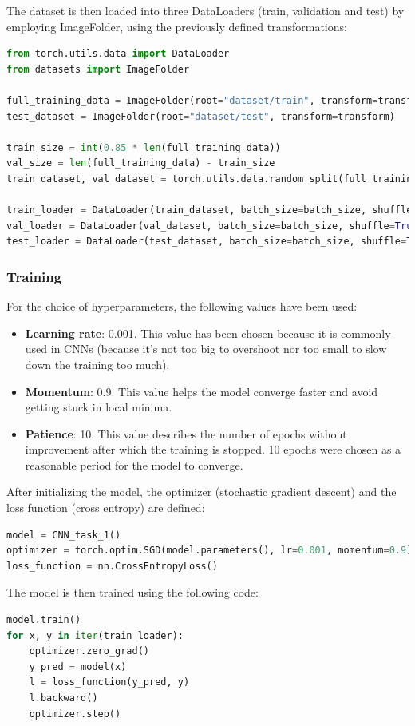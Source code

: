 \documentclass[a4paper, 11pt]{article}
\begin{document}
The dataset is then loaded into three DataLoaders (train, validation and test) 
by employing ImageFolder, using the previously defined transformations: 
\begin{lstlisting}[language=Python]
from torch.utils.data import DataLoader
from datasets import ImageFolder

full_training_data = ImageFolder(root="dataset/train", transform=transform)
test_dataset = ImageFolder(root="dataset/test", transform=transform)

train_size = int(0.85 * len(full_training_data))
val_size = len(full_training_data) - train_size
train_dataset, val_dataset = torch.utils.data.random_split(full_training_data, [train_size, val_size])

train_loader = DataLoader(train_dataset, batch_size=batch_size, shuffle=True)
val_loader = DataLoader(val_dataset, batch_size=batch_size, shuffle=True)
test_loader = DataLoader(test_dataset, batch_size=batch_size, shuffle=True)
\end{lstlisting}

\subsubsection{Training}
For the choice of hyperparameters, the following values have been used:
\begin{itemize}
    \item \textbf{Learning rate}: 0.001. This value has been chosen because it is commonly used in CNNs (because it's not too big to overshoot nor too small to slow down the training too much).
    \item \textbf{Momentum}: 0.9. This value helps the model converge faster and avoid getting stuck in local minima.
    \item \textbf{Patience}: 10. This value describes the number of epochs without improvement after which the training is stopped. 
    10 epochs were chosen as a reasonable period for the model to converge.
\end{itemize}
After initializing the model, the optimizer (stochastic gradient descent) and the loss function (cross entropy) are defined:
\begin{lstlisting}[language=Python]
model = CNN_task_1()
optimizer = torch.optim.SGD(model.parameters(), lr=0.001, momentum=0.9)
loss_function = nn.CrossEntropyLoss()
\end{lstlisting}

\pagebreak

The model is then trained using the following code:
\begin{lstlisting}[language=Python]
model.train()
for x, y in iter(train_loader):
    optimizer.zero_grad()
    y_pred = model(x)
    l = loss_function(y_pred, y)
    l.backward()
    optimizer.step()
\end{lstlisting}
\end{document}
